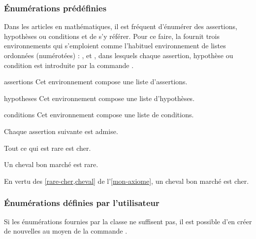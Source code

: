 \documentclass[french,nolocaltoc]{nwejmart}
\newtheorem[style=definition]{fait}
\newtheorem[title=expérience]{experience}
\newtheorem[title-plural=anneaux]{anneau}
\newtheorem[title=idéal,title-plural=idéaux]{ideal}
\begin{document}
\subsubsection{Énumérations prédéfinies}
\label{sec:predefinies-:-listes}

Dans les articles en mathématiques, il est fréquent d'énumérer des assertions,
hypothèses ou conditions et de s'y référer. Pour ce faire, la \nwejmauthorcl{}
fournit trois environnements qui s'emploient comme l'habituel environnement
 de listes ordonnées (numérotées) :
,  et , dans lesquels
chaque assertion, hypothèse ou condition est introduite par la commande
.

\begin{docEnvironment}[doclang/environment content=assertions]{assertions}{}
  Cet environnement compose une liste d'assertions.
\end{docEnvironment}
\begin{docEnvironment}[doclang/environment content=hypothèses]{hypotheses}{}
  Cet environnement compose une liste d'hypothèses.
\end{docEnvironment}
\begin{docEnvironment}[doc new=2019-03-18,doclang/environment content=conditions]{conditions}{}
  Cet environnement compose une liste de conditions.
\end{docEnvironment}

\begin{bodycode}[listing and text,listing options={deletekeywords={[2]label}}]
\begin{axiom}\label{mon-axiome}
  Chaque assertion suivante est admise.
  \begin{assertions}
  \item\label{rare-cher} Tout ce qui est rare est cher.
  \item\label{cheval} Un cheval bon marché est rare.
  \end{assertions}
\end{axiom}
En vertu des \vref{rare-cher,cheval} de l'\vref{mon-axiome},
un cheval bon marché est cher.
\end{bodycode}

\subsubsection{Énumérations définies par l'utilisateur}

Si les énumérations fournies par la classe ne suffisent pas, il est possible
d'en créer de nouvelles au moyen de la commande .
\end{document}
